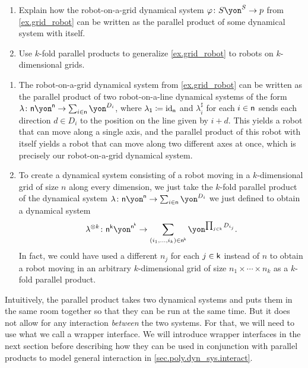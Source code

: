 \documentclass[Book-Poly]{subfiles}
\begin{document}
\begin{exercise} \label{exc.grid_robot_par}
\begin{enumerate}
    \item Explain how the robot-on-a-grid dynamical system $\varphi\colon S\yon^S\to p$ from \cref{ex.grid_robot} can be written as the parallel product of some dynamical system with itself.
    \item Use $k$-fold parallel products to generalize \cref{ex.grid_robot} to robots on $k$-dimensional grids.\qedhere
\end{enumerate}
\begin{solution}
\begin{enumerate}
    \item The robot-on-a-grid dynamical system from \cref{ex.grid_robot} can be written as the parallel product of two robot-on-a-line dynamical systems of the form $\lambda\colon\ord{n}\yon^{\ord{n}}\to\sum_{i\in\ord{n}}\yon^{D_i}$, where $\lambda_{\textsf{1}}\coloneqq\mathrm{id}_{\mathsf{n}}$ and $\lambda^\sharp_i$ for each $i\in\mathsf{n}$ sends each direction $d\in D_i$ to the position on the line given by $i+d$.
    This yields a robot that can move along a single axis, and the parallel product of this robot with itself yields a robot that can move along two different axes at once, which is precisely our robot-on-a-grid dynamical system.
    \item To create a dynamical system consisting of a robot moving in a $k$-dimensional grid of size $n$ along every dimension, we just take the $k$-fold parallel product of the dynamical system $\lambda\colon\ord{n}\yon^{\ord{n}}\to\sum_{i\in\ord{n}}\yon^{D_i}$ we just defined to obtain a dynamical system \[\lambda^{\otimes k}\colon\ord{n}^\ord{k}\yon^{\ord{n}^\ord{k}}\to\sum_{(i_1,\ldots,i_k)\in\ord{n}^\ord{k}}\yon^{\prod_{j\in\ord{k}}D_{i_j}}.\]
    In fact, we could have used a different $n_j$ for each $j\in\mathsf{k}$ instead of $n$ to obtain a robot moving in an arbitrary $k$-dimensional grid of size $n_1\times\cdots\times n_k$ as a $k$-fold parallel product.
\end{enumerate}
\end{solution}
\end{exercise}

Intuitively, the parallel product takes two dynamical systems and puts them in the same room together so that they can be run at the same time.
But it does not allow for any interaction \emph{between} the two systems.
For that, we will need to use what we call a wrapper interface.
We will introduce wrapper interfaces in the next section before describing how they can be used in conjunction with parallel products to model general interaction in \cref{sec.poly.dyn_sys.interact}.
\end{document}

